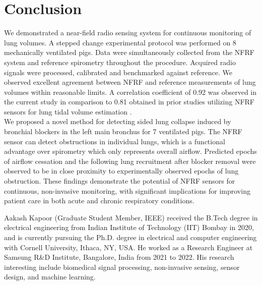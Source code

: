 \documentclass[journal,twoside,web]{ieeecolor}
\begin{document}
\section{Conclusion}
We demonstrated a near-field radio sensing system for continuous monitoring of lung volumes. A stepped change experimental protocol was performed on 8 mechanically ventilated pigs. Data were simultaneously collected from the NFRF system and reference spirometry throughout the procedure. Acquired radio signals were processed, calibrated and benchmarked against reference. We observed excellent agreement between NFRF and reference measurements of lung volumes within reasonable limits. A correlation coefficient of 0.92 was observed in the current study in comparison to 0.81 obtained in prior studies utilizing NFRF sensors for lung tidal volume estimation \cite{sharmaWearableRadiofrequencySensing2020}. \\
We proposed a novel method for detecting sided lung collapse induced by bronchial blockers in the left main bronchus for 7 ventilated pigs. The NFRF sensor can detect obstructions in individual lungs, which is a functional advantage over spirometry which only represents overall airflow. Predicted epochs of airflow cessation and the following lung recruitment after blocker removal were observed to be in close proximity to experimentally observed epochs of lung obstruction. These findings demonstrate the potential of NFRF sensors for continuous, non-invasive monitoring, with significant implications for improving patient care in both acute and chronic respiratory conditions.

\printbibliography

\begin{IEEEbiography}{Aakash Kapoor} (Graduate Student Member, IEEE) received the B.Tech degree in electrical engineering from Indian Institute of Technology (IIT) Bombay in 2020, and is currently pursuing the Ph.D. degree in electrical and computer engineering with Cornell University, Ithaca, NY, USA. 
He worked as a Research Engineer at Samsung R\&D Institute, Bangalore, India from 2021 to 2022. His research interesting include biomedical signal processing, non-invasive sensing, sensor design, and machine learning. 
\end{IEEEbiography}
\end{document}
